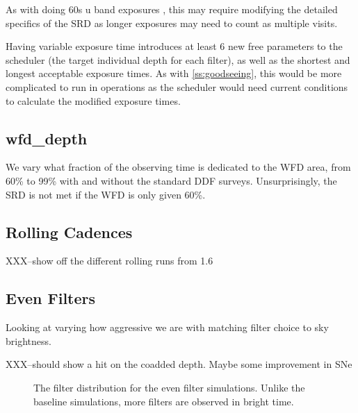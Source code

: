 As with doing 60s u band exposures , this may require modifying the detailed specifics of the SRD as longer exposures may need to count as multiple visits.

Having variable exposure time introduces at least 6 new free parameters to the scheduler (the target individual depth for each filter), as well as the shortest and longest acceptable exposure times.  As with \ref{ss:goodseeing}, this would be more complicated to run in operations as the scheduler would need current conditions to calculate the modified exposure times.

\subsection{wfd\_depth}

We vary what fraction of the observing time is dedicated to the WFD area, from 60\% to 99\% with and without the standard DDF surveys. Unsurprisingly, the SRD is not met if the WFD is only given 60\%.



\subsection{Rolling Cadences}

XXX--show off the different rolling runs from 1.6

\subsection{Even Filters}

Looking at varying how aggressive we are with matching filter choice to sky brightness.  

XXX--should show a hit on the coadded depth. Maybe some improvement in SNe

\begin{figure}
\caption{The filter distribution for the even filter simulations. Unlike the baseline simulations, more filters are observed in bright time.}\label{fig:even_filt_hourglass}
\end{figure}



